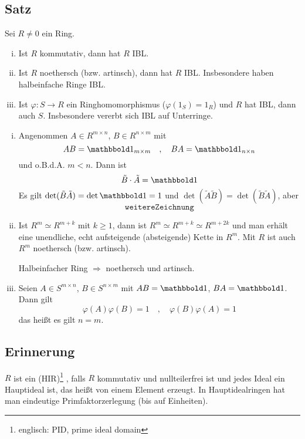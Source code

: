 \subsection[Satz: Kommutative, noethersche Ringe und Urbilder von Ringhomomorphismen haben IBL]{Satz} %
\label{sub:241}
Sei $R \not= 0$ ein Ring.
\begin{enumerate}[(i)]
	\item Ist $R$ kommutativ, dann hat $R$ IBL.
	\item Ist $R$ noethersch (bzw. artinsch), dann hat $R$ IBL. Insbesondere haben halbeinfache Ringe IBL.
	\item Ist $\varphi : S \to R$ ein Ringhomomorphismus ($\varphi(1_S)= 1_R$) und $R$ hat IBL, dann auch $S$. Insbesondere vererbt sich IBL auf Unterringe.
\end{enumerate}
\begin{enumerate}[(i)]
	\item Angenommen $A \in R^{m \times n}$, $B \in R^{n \times m}$ mit 
	\[
		AB = \ind_{m \times m}\quad , 	\quad  BA= \ind_{n \times n} 
	\]
	und o.B.d.A. $m < n$. Dann ist 
	\[
		\tilde{B} \cdot \tilde{A} = \ind
	\]
	Es gilt $\det( \tilde{B}\tilde{A})= \det \ind = 1 $ und $\det(\tilde{A}\tilde{B}) = \det(\tilde{B}\tilde{A})$, aber 
	\[
		\mathtt{weitere Zeichnung}
	\]
	\item Ist $R^m \simeq R^{m+k}$ mit $k \ge 1$, dann ist $R^m \simeq R^{m+k} \simeq R^{m+2k}$ und man erhält eine unendliche, echt aufsteigende (absteigende) Kette in
	$R^m$. Mit $R$ ist auch $R^m$ noethersch (bzw. artinsch). \light
	
	Halbeinfacher Ring $\Rightarrow $ noethersch und artinsch.
	\item Seien $A \in S^{m \times n}$, $B \in S^{n \times m}$ mit $AB = \ind$, $BA = \ind$. Dann gilt 
	\[
		\varphi(A) \varphi(B)= 1 \quad , \quad \varphi(B) \varphi(A) = 1
	\]
	das heißt es gilt $n=m$.
\end{enumerate}

\subsection*{Erinnerung} %
\label{sub:erinnerung_hir}
$R$ ist ein  (HIR)\footnote{englisch: PID, prime ideal domain} , falls $R$ kommutativ und nullteilerfrei ist und jedes Ideal ein Hauptideal ist, das 
heißt von einem Element erzeugt. In Hauptidealringen hat man eindeutige Primfaktorzerlegung (bis auf Einheiten).

